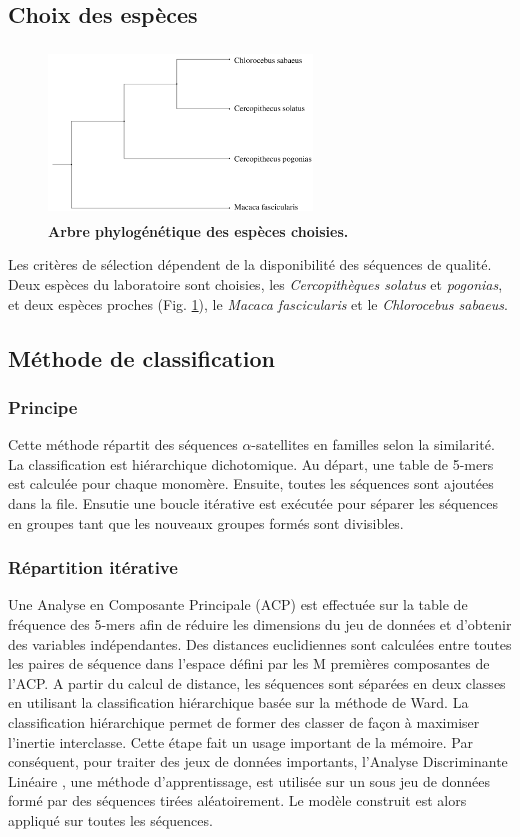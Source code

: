\documentclass[12pt,a4paper]{article}
\begin{document}
\subsection{Choix des espèces}
	\begin{figure}
		\center
		\includegraphics[height=4.5cm, width=7cm]{img/arbre_especes.png}
		\caption{\textbf{Arbre phylogénétique des espèces choisies.}
		\label{fig:arbre_presentation}}
	\end{figure}
Les critères de sélection dépendent de la disponibilité des séquences de qualité. Deux espèces du laboratoire sont choisies, les \textit{Cercopithèques solatus} et \textit{pogonias}, et deux espèces proches (Fig. \ref{fig:arbre_presentation}), le \textit{Macaca fascicularis} et le \textit{Chlorocebus sabaeus}.  

\subsection{Méthode de classification}
	\subsubsection{Principe}
Cette méthode \cite{rapport_florence} répartit des séquences $\alpha$-satellites en familles selon la similarité. La classification est hiérarchique dichotomique. Au départ, une table de 5-mers est calculée pour chaque monomère.  Ensuite, toutes les séquences sont ajoutées dans la file. Ensutie une boucle itérative est exécutée pour séparer les séquences en groupes tant que les nouveaux groupes formés sont divisibles.
	\subsubsection{Répartition itérative}
Une Analyse en Composante Principale (ACP) est effectuée sur la table de fréquence des 5-mers afin de réduire les dimensions du jeu de données et d’obtenir des variables indépendantes. Des distances euclidiennes sont calculées entre toutes les paires de séquence dans l’espace défini par les M premières composantes de l’ACP. A partir du calcul de distance, les séquences sont séparées en deux classes en utilisant la classification hiérarchique basée sur la méthode de Ward. La classification hiérarchique permet de former des classer de façon à maximiser l’inertie interclasse. Cette étape fait un usage important de la mémoire. Par conséquent, pour traiter des jeux de données importants, l’Analyse Discriminante Linéaire , une méthode d’apprentissage, est utilisée sur un sous jeu de données formé par des séquences tirées aléatoirement. Le modèle construit est alors appliqué sur toutes les séquences.
\end{document}
